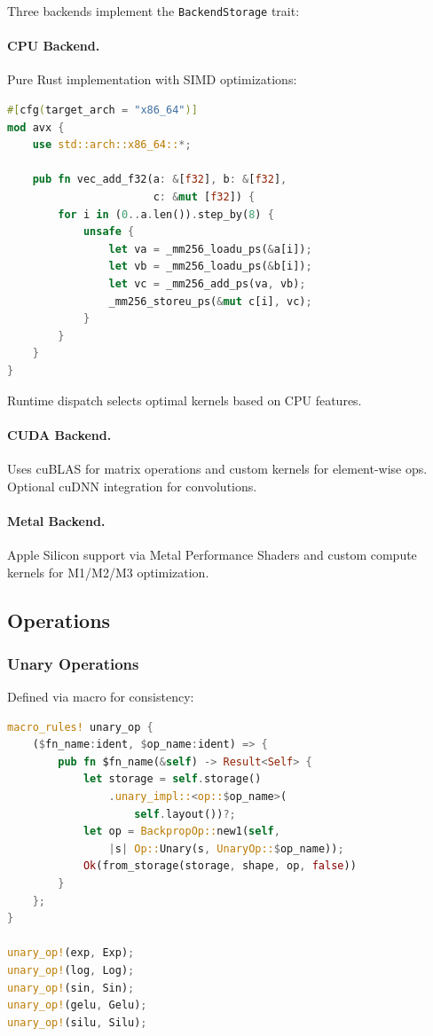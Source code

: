 \documentclass[11pt,twocolumn]{article}
\begin{document}
Three backends implement the \texttt{BackendStorage} trait:

\paragraph{CPU Backend.} Pure Rust implementation with SIMD optimizations:

\begin{lstlisting}[language=Rust]
#[cfg(target_arch = "x86_64")]
mod avx {
    use std::arch::x86_64::*;

    pub fn vec_add_f32(a: &[f32], b: &[f32],
                       c: &mut [f32]) {
        for i in (0..a.len()).step_by(8) {
            unsafe {
                let va = _mm256_loadu_ps(&a[i]);
                let vb = _mm256_loadu_ps(&b[i]);
                let vc = _mm256_add_ps(va, vb);
                _mm256_storeu_ps(&mut c[i], vc);
            }
        }
    }
}
\end{lstlisting}

Runtime dispatch selects optimal kernels based on CPU features.

\paragraph{CUDA Backend.} Uses cuBLAS for matrix operations and custom kernels for element-wise ops. Optional cuDNN integration for convolutions.

\paragraph{Metal Backend.} Apple Silicon support via Metal Performance Shaders and custom compute kernels for M1/M2/M3 optimization.

\subsection{Operations}

\subsubsection{Unary Operations}

Defined via macro for consistency:

\begin{lstlisting}[language=Rust]
macro_rules! unary_op {
    ($fn_name:ident, $op_name:ident) => {
        pub fn $fn_name(&self) -> Result<Self> {
            let storage = self.storage()
                .unary_impl::<op::$op_name>(
                    self.layout())?;
            let op = BackpropOp::new1(self,
                |s| Op::Unary(s, UnaryOp::$op_name));
            Ok(from_storage(storage, shape, op, false))
        }
    };
}

unary_op!(exp, Exp);
unary_op!(log, Log);
unary_op!(sin, Sin);
unary_op!(gelu, Gelu);
unary_op!(silu, Silu);
\end{lstlisting}
\end{document}
